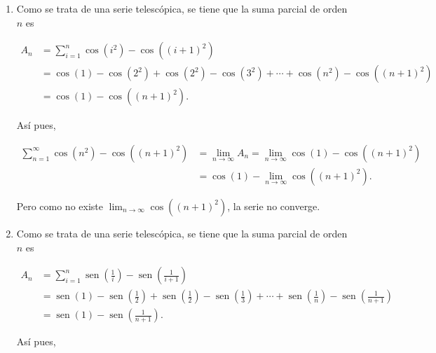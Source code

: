 \documentclass[
  spanish,
  a4paper,
]{scrreport}
\theoremstyle{definition}
\theoremstyle{remark}
\begin{document}
\begin{tcolorbox}[enhanced jigsaw, arc=.35mm, bottomrule=.15mm, bottomtitle=1mm, breakable, colback=white, colbacktitle=quarto-callout-tip-color!10!white, colframe=quarto-callout-tip-color-frame, coltitle=black, left=2mm, leftrule=.75mm, opacityback=0, opacitybacktitle=0.6, rightrule=.15mm, title=\textcolor{quarto-callout-tip-color}{\faLightbulb}\hspace{0.5em}{Solución}, titlerule=0mm, toprule=.15mm, toptitle=1mm]

\begin{enumerate}
\def\labelenumi{\alph{enumi}.}
\item
  Como se trata de una serie telescópica, se tiene que la suma parcial
  de orden \(n\) es

  \begin{align*}
   A_n &= \sum_{i=1}^n \cos(i^2)-\cos((i+1)^2)\\  
   &= \cos(1)-\cos(2^2)+\cos(2^2)-\cos(3^2)+\cdots +\cos(n^2)-\cos((n+1)^2)\\  
   &= \cos(1)-\cos((n+1)^2).
   \end{align*}

  Así pues,

  \begin{align*}
   \sum_{n=1}^\infty \cos(n^2)-\cos((n+1)^2) &= \lim_{n\to\infty} A_n = \lim_{n\to\infty} \cos(1)-\cos((n+1)^2) \\ 
   &= \cos(1)-\lim_{n\to\infty} \cos((n+1)^2).
   \end{align*}

  Pero como no existe \(\lim_{n\to\infty} \cos((n+1)^2)\), la serie no
  converge.
\item
  Como se trata de una serie telescópica, se tiene que la suma parcial
  de orden \(n\) es

  \begin{align*}
   A_n &= \sum_{i=1}^n \operatorname{sen}\left(\frac{1}{i}\right)- \operatorname{sen}\left(\frac{1}{i+1}\right)\\  
   &=  \operatorname{sen}(1)- \operatorname{sen}\left(\frac{1}{2}\right)+ \operatorname{sen}\left(\frac{1}{2}\right)- \operatorname{sen}\left(\frac{1}{3}\right)+ \cdots +  \operatorname{sen}\left(\frac{1}{n}\right)- \operatorname{sen}\left(\frac{1}{n+1}\right)\\  
   &= \operatorname{sen}(1)- \operatorname{sen}\left(\frac{1}{n+1}\right).
   \end{align*}

  Así pues,


\end{enumerate}
\end{tcolorbox}
\end{document}
